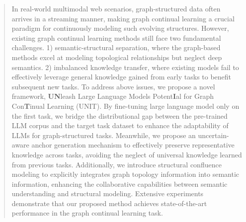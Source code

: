 \documentclass[sigconf]{acmart}
\begin{document}







\begin{abstract}
In real-world multimodal web scenarios, graph-structured data often arrives in a streaming manner, making graph continual learning a crucial paradigm for continuously modeling such evolving structures.
However, existing graph continual learning methods still face two fundamental challenges.
1) semantic-structural separation, where the graph-based methods excel at modeling topological relationships but neglect deep semantics.
2) imbalanced knowledge transfer, where existing models fail to effectively leverage general knowledge gained from early tasks to benefit subsequent new tasks.
To address above issues, we propose a novel framework, \textbf{UN}leash Large Language Models Potent\textbf{I}al for Graph Con\textbf{T}inual Learning (UNIT). 
By fine-tuning large language model only on the first task, we bridge the distributional gap between the pre-trained LLM corpus and the target task dataset to enhance the adaptability of LLMs for graph-structured tasks.
Meanwhile, we propose an uncertain-aware anchor generation mechanism to effectively preserve representative knowledge across tasks, avoiding the neglect of universal knowledge learned from previous tasks.
Additionally, we introduce structural confluence modeling to explicitly integrates graph topology information into semantic information, enhancing the collaborative capabilities between semantic understanding and structural modeling.
Extensive experiments demonstrate that our proposed method achieves state-of-the-art performance in the graph continual learning task.
\end{abstract}
\end{document}
